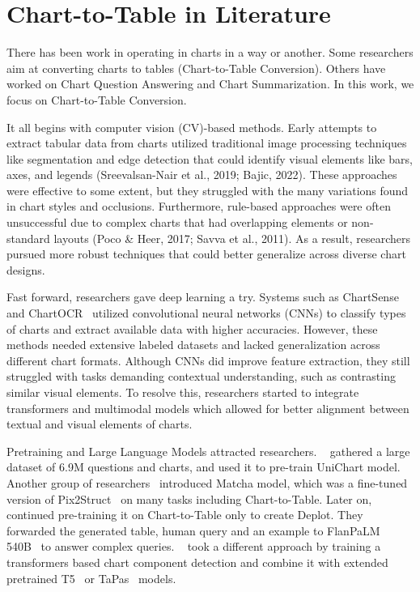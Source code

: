 \documentclass[
	letterpaper, %
]{jdf}
\begin{document}
       \section{Chart-to-Table in Literature}\label{sect:literature}
       There has been work in operating in charts in a way or another.
       Some researchers aim at converting charts to tables (Chart-to-Table Conversion).
       Others have worked on Chart Question Answering and Chart Summarization.
       In this work, we focus on Chart-to-Table Conversion.

    It all begins with computer vision (CV)-based methods. Early attempts to extract tabular data from charts utilized traditional image processing techniques like segmentation and edge detection that could identify visual elements like bars, axes, and legends (Sreevalsan-Nair et al., 2019; Bajic, 2022). These approaches were effective to some extent, but they struggled with the many variations found in chart styles and occlusions. Furthermore, rule-based approaches were often unsuccessful due to complex charts that had overlapping elements or non-standard layouts (Poco \& Heer, 2017; Savva et al., 2011). As a result, researchers pursued more robust techniques that could better generalize across diverse chart designs.

    Fast forward, researchers gave deep learning a try.
    Systems such as ChartSense~\cite{jung2017chartsense} and ChartOCR~\cite{luo2021chartocr} utilized convolutional neural networks (CNNs) to classify types of charts and extract available data with higher accuracies.
    However, these methods needed extensive labeled datasets and lacked generalization across different chart formats.
    Although CNNs did improve feature extraction, they still struggled with tasks demanding contextual understanding, such as contrasting similar visual elements.
    To resolve this, researchers started to integrate transformers and multimodal models which allowed for better alignment between textual and visual elements of charts.
    
Pretraining and Large Language Models attracted researchers.
~\cite{masry2023unichart} gathered a large dataset of 6.9M questions and charts, and used it to pre-train UniChart model.
Another group of researchers~\cite{liu2022matcha} introduced Matcha model, which was a fine-tuned version of Pix2Struct~\cite{lee2023pix2struct} on many tasks including Chart-to-Table.
Later on,~\cite{liu2022deplot} continued pre-training it on Chart-to-Table only to create Deplot.
They forwarded the generated table, human query and an example to FlanPaLM 540B~\cite{chung2024scaling} to answer complex queries.
~\cite{cheng2023chartreader} took a different approach by training a transformers based chart component detection and combine it with extended pretrained T5~\cite{raffel2020exploring} or TaPas~\cite{herzig2020tapas} models.
\end{document}

